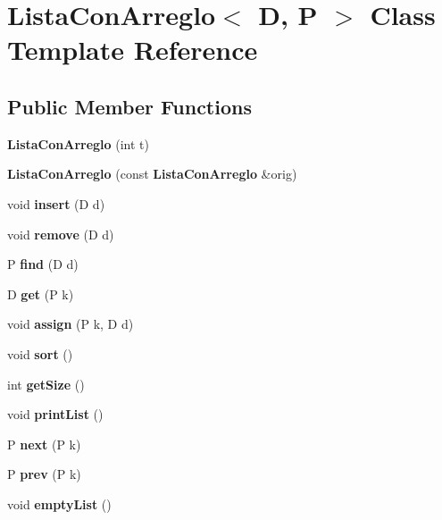 \section{Lista\-Con\-Arreglo$<$ D, P $>$ Class Template Reference}
\label{class_lista_con_arreglo}
\subsection*{Public Member Functions}
\begin{DoxyCompactItemize}
\item 
{\bfseries Lista\-Con\-Arreglo} (int t)\label{class_lista_con_arreglo_aaba86d7a6231523f461d4eb84f3e6018}

\item 
{\bfseries Lista\-Con\-Arreglo} (const {\bf Lista\-Con\-Arreglo} \&orig)\label{class_lista_con_arreglo_a9332aeb68ad97900e9a1f6954a60eb86}

\item 
void {\bfseries insert} (D d)\label{class_lista_con_arreglo_a480a5afe2aca7a9c5c47c741d8d1461c}

\item 
void {\bfseries remove} (D d)\label{class_lista_con_arreglo_a947265ee8342519f01a77a2c99dfb698}

\item 
P {\bfseries find} (D d)\label{class_lista_con_arreglo_a0a7213414718fabad27e9384ce0fd805}

\item 
D {\bfseries get} (P k)\label{class_lista_con_arreglo_ad696c16641bed2673ee47332d86edbf3}

\item 
void {\bfseries assign} (P k, D d)\label{class_lista_con_arreglo_a6c16d9ffa4a12f7a2c10605154b7cd9a}

\item 
void {\bfseries sort} ()\label{class_lista_con_arreglo_a8ec6bf759ee961209b48845cc0f382de}

\item 
int {\bfseries get\-Size} ()\label{class_lista_con_arreglo_a47db1424e05495d387a2c48f4f0665fd}

\item 
void {\bfseries print\-List} ()\label{class_lista_con_arreglo_a298da041e7649775a58dd552a2d92024}

\item 
P {\bfseries next} (P k)\label{class_lista_con_arreglo_ab2c8674bf6690a13b0675fead166facf}

\item 
P {\bfseries prev} (P k)\label{class_lista_con_arreglo_ae2bd7c8b9b6cc40e20a8c9f00a730c8e}

\item 
void {\bfseries empty\-List} ()\label{class_lista_con_arreglo_aca7d31f41287953b7541cce2f65e332b}

\end{DoxyCompactItemize}
